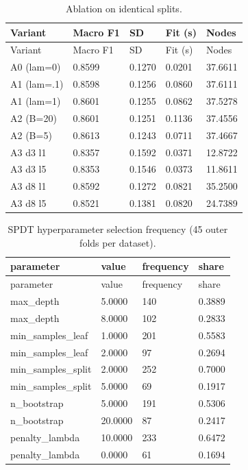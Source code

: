 \documentclass[
  conference]{IEEEtran}
\begin{document}
\begin{longtable}[]{@{}lllll@{}}
\caption{Ablation on identical splits.}\tabularnewline
\toprule\noalign{}
Variant & Macro F1 & SD & Fit (s) & Nodes \\
\midrule\noalign{}
\endfirsthead
\toprule\noalign{}
Variant & Macro F1 & SD & Fit (s) & Nodes \\
\midrule\noalign{}
\endhead
\bottomrule\noalign{}
\endlastfoot
A0 (lam=0) & 0.8599 & 0.1270 & 0.0201 & 37.6611 \\
A1 (lam=.1) & 0.8598 & 0.1256 & 0.0860 & 37.6111 \\
A1 (lam=1) & 0.8601 & 0.1255 & 0.0862 & 37.5278 \\
A2 (B=20) & 0.8601 & 0.1251 & 0.1136 & 37.4556 \\
A2 (B=5) & 0.8613 & 0.1243 & 0.0711 & 37.4667 \\
A3 d3 l1 & 0.8357 & 0.1592 & 0.0371 & 12.8722 \\
A3 d3 l5 & 0.8353 & 0.1546 & 0.0373 & 11.8611 \\
A3 d8 l1 & 0.8592 & 0.1272 & 0.0821 & 35.2500 \\
A3 d8 l5 & 0.8521 & 0.1381 & 0.0820 & 24.7389 \\
\end{longtable}

\begin{longtable}[]{@{}llll@{}}
\caption{SPDT hyperparameter selection frequency (45 outer folds per
dataset).}\tabularnewline
\toprule\noalign{}
parameter & value & frequency & share \\
\midrule\noalign{}
\endfirsthead
\toprule\noalign{}
parameter & value & frequency & share \\
\midrule\noalign{}
\endhead
\bottomrule\noalign{}
\endlastfoot
max\_depth & 5.0000 & 140 & 0.3889 \\
max\_depth & 8.0000 & 102 & 0.2833 \\
min\_samples\_leaf & 1.0000 & 201 & 0.5583 \\
min\_samples\_leaf & 2.0000 & 97 & 0.2694 \\
min\_samples\_split & 2.0000 & 252 & 0.7000 \\
min\_samples\_split & 5.0000 & 69 & 0.1917 \\
n\_bootstrap & 5.0000 & 191 & 0.5306 \\
n\_bootstrap & 20.0000 & 87 & 0.2417 \\
penalty\_lambda & 10.0000 & 233 & 0.6472 \\
penalty\_lambda & 0.0000 & 61 & 0.1694 \\
\end{longtable}
\end{document}

